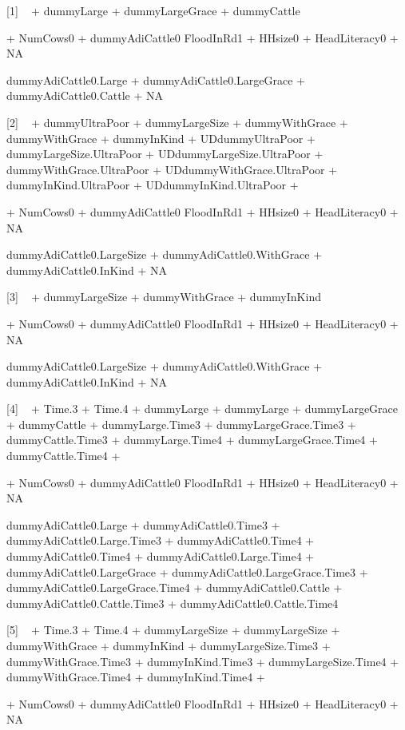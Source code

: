 \begin{Schunk}
\begin{Soutput}


[1]
 ~  + dummyLarge + dummyLargeGrace + dummyCattle

 + NumCows0
 + dummyAdiCattle0
FloodInRd1 + HHsize0 + HeadLiteracy0 + NA

dummyAdiCattle0.Large + dummyAdiCattle0.LargeGrace + dummyAdiCattle0.Cattle + NA

 

[2]
 ~  + dummyUltraPoor + dummyLargeSize + dummyWithGrace
 + dummyWithGrace + dummyInKind + UDdummyUltraPoor
 + dummyLargeSize.UltraPoor + UDdummyLargeSize.UltraPoor + dummyWithGrace.UltraPoor
 + UDdummyWithGrace.UltraPoor + dummyInKind.UltraPoor + UDdummyInKind.UltraPoor
 + 

 + NumCows0
 + dummyAdiCattle0
FloodInRd1 + HHsize0 + HeadLiteracy0 + NA

dummyAdiCattle0.LargeSize + dummyAdiCattle0.WithGrace + dummyAdiCattle0.InKind + NA

 

[3]
 ~  + dummyLargeSize + dummyWithGrace + dummyInKind

 + NumCows0
 + dummyAdiCattle0
FloodInRd1 + HHsize0 + HeadLiteracy0 + NA

dummyAdiCattle0.LargeSize + dummyAdiCattle0.WithGrace + dummyAdiCattle0.InKind + NA

 

[4]
 ~  + Time.3 + Time.4 + dummyLarge
 + dummyLarge + dummyLargeGrace + dummyCattle
 + dummyLarge.Time3 + dummyLargeGrace.Time3 + dummyCattle.Time3
 + dummyLarge.Time4 + dummyLargeGrace.Time4 + dummyCattle.Time4
 + 

 + NumCows0
 + dummyAdiCattle0
FloodInRd1 + HHsize0 + HeadLiteracy0 + NA

dummyAdiCattle0.Large + dummyAdiCattle0.Time3 + dummyAdiCattle0.Large.Time3 + dummyAdiCattle0.Time4
 + dummyAdiCattle0.Time4 + dummyAdiCattle0.Large.Time4 + dummyAdiCattle0.LargeGrace
 + dummyAdiCattle0.LargeGrace.Time3 + dummyAdiCattle0.LargeGrace.Time4 + dummyAdiCattle0.Cattle
 + dummyAdiCattle0.Cattle.Time3 + dummyAdiCattle0.Cattle.Time4

 

[5]
 ~  + Time.3 + Time.4 + dummyLargeSize
 + dummyLargeSize + dummyWithGrace + dummyInKind
 + dummyLargeSize.Time3 + dummyWithGrace.Time3 + dummyInKind.Time3
 + dummyLargeSize.Time4 + dummyWithGrace.Time4 + dummyInKind.Time4
 + 

 + NumCows0
 + dummyAdiCattle0
FloodInRd1 + HHsize0 + HeadLiteracy0 + NA


\end{Soutput}
\end{Schunk}
